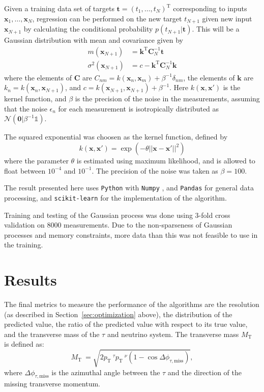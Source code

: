 \documentclass[twocolumn]{scrartcl}
\newcommand{\pt}{\ensuremath{p_\text{T}}~}
\newcommand{\mt}{\ensuremath{M_\text{T}}~}
\begin{document}
Given a training data set of targets $\mathbf t = (t_1,\ldots,t_N)^\text{T}$ corresponding to inputs $\mathbf x_1,\ldots,\mathbf x_N$, regression can be performed on the new target $t_{N+1}$ given new input $\mathbf x_{N+1}$ by calculating the conditional probability $p(t_{N+1}|\mathbf t)$. This will be a Gaussian distribution with mean and covariance given by
\begin{align}
    m(\mathbf x_{N+1}) &= \mathbf k^\text{T} \mathbf C^{-1}_N \mathbf t \\
    \sigma^2(\mathbf x_{N+1}) &= c - \mathbf k^\text{T} \mathbf C^{-1}_N \mathbf k
\end{align}
where the elements of $\mathbf C$ are $C_{nm} = k(\mathbf x_n, \mathbf x_m) + \beta^{-1}\delta_{nm}$, the elements of $\mathbf k$ are $k_n = k(\mathbf x_n, \mathbf x_{N+1})$, and $c = k(\mathbf x_{N+1}, \mathbf x_{N+1}) + \beta^{-1}$. Here $k(\mathbf x, \mathbf x')$ is the kernel function, and $\beta$ is the precision of the noise in the measurements, assuming that the noise $\epsilon_n$ for each measurement is isotropically distributed as $\mathcal N(\mathbf 0 | \beta^{-1}\mathbb 1)$.

The squared exponential was choosen as the kernel function, defined by
\begin{equation}
    k(\mathbf x, \mathbf x') = \exp( -\theta ||\mathbf x - \mathbf x'||^2 )
\end{equation}
where the parameter $\theta$ is estimated using maximum likelihood, and is allowed to float between $10^{-4}$ and $10^{-1}$. The precision of the noise was taken as $\beta = 100$. 

The result presented here uses \texttt{Python} with \texttt{Numpy} \cite{numpy}, and \texttt{Pandas} \cite{pandas} for general data processing, and \texttt{scikit-learn} \cite{scikit-learn} for the implementation of the algorithm.

Training and testing of the Gaussian process was done using 3-fold cross validation on 8000 measurements. Due to the non-sparseness of Gaussian processes and memory constraints, more data than this was not feasible to use in the training.
\section{Results}
\label{sec:results}

The final metrics to measure the performance of the algorithms are the resolution (as described in Section~\ref{sec:optimization} above), the distribution of the predicted value, the ratio of the predicted value with respect to its true value, and the transverse mass of the $τ$ and neutrino system. The transverse mass $\mt$ is defined as:
\begin{equation}
  \label{eq:mt}
  \mt=\sqrt{ 2 \pt^\tau \pt^\nu   (1-\cos \Delta\phi_{\tau,\text{miss}}) },
\end{equation}
where $\Delta\phi_{\tau,\text{miss}}$ is the azimuthal angle between the $\tau$ and the direction of the missing transverse momentum. 
\end{document}
